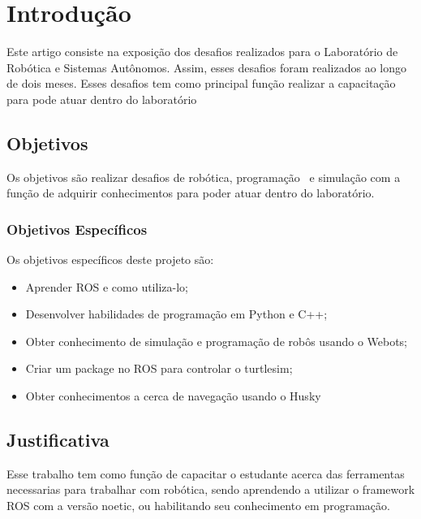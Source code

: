 \chapter{Introdução}
\label{chap:intro}

Este artigo consiste na exposição dos desafios realizados para o 
Laboratório de Robótica e Sistemas Autônomos. Assim, esses desafios foram realizados ao longo de dois meses. Esses desafios tem como principal função realizar a capacitação para pode atuar dentro do laboratório


\section{Objetivos}
\label{sec:obj}
Os objetivos são realizar desafios de robótica, programação 
e simulação com a função de adquirir conhecimentos para poder atuar dentro do laboratório.
\label{sec:obj}

\subsection{Objetivos Específicos}
\label{ssec:objesp}
Os objetivos específicos deste projeto são:
\begin{itemize}utilizá-lo
      \item Aprender ROS e como utiliza-lo;
      \item Desenvolver habilidades de programação em Python e C++;
      \item Obter conhecimento de simulação e programação de robôs usando o Webots;
      \item Criar um package no ROS para controlar o turtlesim;
      \item Obter conhecimentos a cerca de navegação usando o Husky
  \end{itemize}



\section{Justificativa}
\label{sec:justi}

Esse trabalho tem como função de capacitar o estudante acerca das 
ferramentas necessarias para trabalhar com robótica, sendo aprendendo 
a utilizar o framework ROS com a versão noetic, ou habilitando seu
conhecimento em programação.


